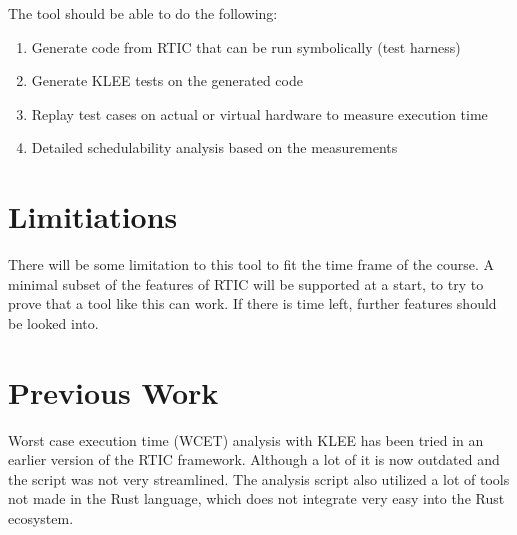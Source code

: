 The tool should be able to do the following:
%
\begin{enumerate}
    \item Generate code from RTIC that can be run symbolically (test harness)
    \item Generate KLEE tests on the generated code
    \item Replay test cases on actual or virtual hardware to measure execution time
    \item Detailed schedulability analysis based on the measurements
\end{enumerate}

\section{Limitiations}
There will be some limitation to this tool to fit the time frame of the course.
A minimal subset of the features of RTIC will be supported at a start, to try
to prove that a tool like this can work. If there is time left, further
features should be looked into. 

\section{Previous Work}
Worst case execution time (WCET) analysis with KLEE has been tried in an earlier
version of the RTIC framework\cite{lindner}. Although a lot of it is now
outdated and the script was not very streamlined. The analysis script also 
utilized a lot of tools not made in the Rust language, which does not integrate
very easy into the Rust ecosystem.

